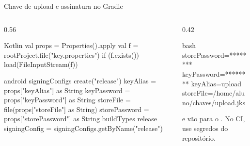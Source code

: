 \documentclass[aspectratio=169,10pt]{beamer}
\begin{document}
\begin{frame}[fragile]{Chave de upload e assinatura no Gradle}
  \begin{columns}[T]
    \begin{column}{0.56\textwidth}
\begin{codigo}[title=android/app/build.gradle.kts (trechos)]{Kotlin}
val props = Properties().apply {
    val f = rootProject.file("key.properties")
    if (f.exists()) load(FileInputStream(f))
}

android {
    signingConfigs {
        create("release") {
            keyAlias = props["keyAlias"] as String
            keyPassword = props["keyPassword"] as String
            storeFile = file(props["storeFile"] as String)
            storePassword = props["storePassword"] as String
        }
    }
    buildTypes {
        release {
            signingConfig = signingConfigs.getByName("release")
        }
    }
}
\end{codigo}
    \end{column}
    \begin{column}{0.42\textwidth}
\begin{codigo}[title=android/key.properties]{bash}
storePassword=********
keyPassword=********
keyAlias=upload
storeFile=/home/aluno/chaves/upload.jks
\end{codigo}
      \begin{atencao}
        \cod{key.properties} e  vão para o . No CI, use segredos do repositório.
      \end{atencao}
    \end{column}
  \end{columns}
\end{frame}
\end{document}
